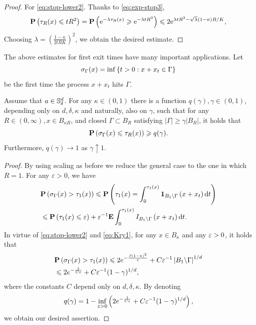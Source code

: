 \begin{proof}
    For \eqref{eq:stop-lower2}. Thanks to \eqref{eq:exp-stop3}, 
    \begin{equation*}
        \begin{aligned}
            {\mathbf P}\left({\tau_R(x)} \leqslant t R^2\right) = {\mathbf P} \left(\mathrm{e}^{-\lambda\tau_R(x)} \geqslant \mathrm{e}^{-\lambda t R^2}\right) \leqslant 2\mathrm{e}^{\lambda t R^2-\sqrt{\lambda}(1-\kappa) R / K}, 
        \end{aligned}
    \end{equation*}
    Choosing \(\lambda=(\frac{1-\kappa}{2tRK})^2\), we obtain the desired estimate. 
\end{proof}

The above estimates for first exit times have many important applications. Let 
\[
    \sigma_{\Gamma}(x)=\inf\left\{t>0: x+x_t\in \Gamma \right\}
\]
be the first time the process $x+x_t$ hits $\Gamma$.
\begin{proposition}\label{prop:hit}
    Assume that \(a\in {\mathbb S}^d_{\delta}\). For any $\kappa \in(0,1)$ there is a function $q(\gamma), \gamma \in(0,1)$, depending only on $d, \delta,\kappa$ and naturally, also on $\gamma$, such that for any $R \in(0, \infty), x \in B_{\kappa R}$, and closed $\Gamma \subset B_R$ satisfying $|\Gamma| \geq \gamma\left|B_R\right|$, it holds that
    \[
        {\mathbf P}\left(\sigma_{\Gamma}(x) \leqslant \tau_R(x)\right) \geqslant q(\gamma).
    \]
    Furthermore, $q(\gamma) \rightarrow 1$ as $\gamma \uparrow 1$. 
\end{proposition}
\begin{proof}
    By using scaling as before we reduce the general case to the one in which $R=1$. For any $\varepsilon>0$, we have
    \[
        \begin{aligned}
			& {\mathbf P}\left(\sigma_{\Gamma}(x)>\tau_1(x)\right) \leqslant {\mathbf P}\left(\tau_1(x)=\int_0^{\tau_1(x)} {\mathbf{1}}_{B_1 \backslash \Gamma}\left(x+x_t\right) \text{\rm{d}} t\right) \\
			& \leqslant {\mathbf P}\left(\tau_1(x) \leqslant \varepsilon\right)+\varepsilon^{-1} {\mathbf E} \int_0^{\tau_1(x)} I_{B_1 \backslash \Gamma}\left(x+x_t\right) \text{\rm{d}} t .
	\end{aligned}
    \]
    In virtue of \eqref{eq:stop-lower2} and \eqref{eq:Kry1}, for any \(x\in B_{\kappa}\) and any \(\varepsilon>0\), it holds that 
    \[
        \begin{aligned}
			& {\mathbf P}\left(\sigma_{\Gamma}(x)>\tau_1(x)\right) \leqslant 2 e^{-\frac{\beta(1-\kappa)^2}{\varepsilon}}+C \varepsilon^{-1}\left|B_1 \backslash \Gamma\right|^{1 / d} \\
			& \leqslant 2 e^{-  \frac{1}{C\varepsilon}}+C \varepsilon^{-1}(1-\gamma)^{1 / d}, 
	\end{aligned}
    \]
    where the constants $C$ depend only on $d, \delta, \kappa$. By denoting
    \[
        q(\gamma)=1-\inf _{\varepsilon>0}\left(2 e^{-\frac{1}{C\varepsilon}}+ C \varepsilon^{-1}(1-\gamma)^{1 / d}\right), 
    \]
    we obtain our desired assertion. 
\end{proof}


